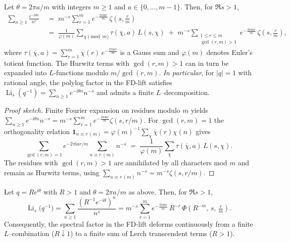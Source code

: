 \begin{proposition}
\label{prop:lerch-L-unit}
Let $\theta=2\pi a/m$ with integers $m\ge1$ and $a\in\{0,\dots,m-1\}$. Then, for $\Re s>1$,
\begin{align*}
\sum_{n\ge1}\frac{e^{-\mathrm{i}\theta n}}{n^{s}}
&\;=\; m^{-s}\sum_{r=1}^{m} e^{-\tfrac{2\pi \mathrm{i} a r}{m}}\,\zeta\!\left(s,\tfrac{r}{m}\right)\\
&\;=\; \frac{1}{\varphi(m)}\sum_{\chi\!\!\!\pmod m} \tau(\overline{\chi},a)\,L(s,\chi)
\;+\;m^{-s}\!\!\sum_{\substack{1\le r\le m\\ \gcd(r,m)>1}}\! e^{-\tfrac{2\pi \mathrm{i} a r}{m}}\,\zeta\!\left(s,\tfrac{r}{m}\right),
\end{align*}
where $\tau(\overline{\chi},a)=\sum_{r=1}^{m}\overline{\chi}(r)\,e^{-\tfrac{2\pi \mathrm{i} a r}{m}}$ is a Gauss sum and $\varphi(m)$ denotes Euler's totient function. The Hurwitz terms with $\gcd(r,m)>1$ can in turn be expanded into $L$-functions modulo $m/\gcd(r,m)$.
\emph{In particular}, for $|q|=1$ with rational angle, the polylog factor in the FD-lift satisfies
$\operatorname{Li}_s(q^{-1})=\sum_{n\ge1} e^{-\mathrm{i}\theta n}n^{-s}$ and admits a finite $L$--decomposition.
\end{proposition}

\begin{proof}[Proof sketch]
Finite Fourier expansion on residues modulo $m$ yields\\
$\sum_{n\ge1}\! e^{-\mathrm{i}\theta n} n^{-s}=m^{-s}\sum_{r=1}^m e^{-\frac{2\pi \mathrm{i} a r}{m}} \zeta(s,r/m)$.
For $\gcd(r,m)=1$ the orthogonality relation $\mathbf 1_{n\equiv r\,(m)}=\varphi(m)^{-1}\sum_{\chi}\overline{\chi}(r)\chi(n)$ gives
\[
\sum_{\gcd(r,m)=1}e^{-2\pi \mathrm{i} a r/m}\sum_{n\equiv r\,(m)}n^{-s}\;=\;\frac{1}{\varphi(m)}\sum_{\chi}\tau(\overline{\chi},a)\,L(s,\chi).
\]
The residues with $\gcd(r,m)>1$ are annihilated by all characters mod $m$ and remain as Hurwitz terms, using $\sum_{n\equiv r\,(m)}n^{-s}=m^{-s}\zeta(s,r/m)$.
\end{proof}

\begin{proposition}
\label{prop:lerch-deformation}
Let $q=R e^{\mathrm{i}\theta}$ with $R>1$ and $\theta=2\pi a/m$ as above. Then, for $\Re s>1$,
\[
\operatorname{Li}_s\!\big(q^{-1}\big)
=\sum_{n\ge1}\frac{(R^{-1}e^{-\mathrm{i}\theta})^{n}}{n^{s}}
=m^{-s}\sum_{r=1}^{m} e^{-\tfrac{2\pi \mathrm{i} a r}{m}}\,R^{-r}\,\Phi\!\left(R^{-m},\,s,\,\tfrac{r}{m}\right).
\]
Consequently, the spectral factor in the FD-lift deforms continuously from a finite $L$--combination
($R\downarrow 1$) to a finite sum of Lerch transcendent terms ($R>1$).
\end{proposition}

